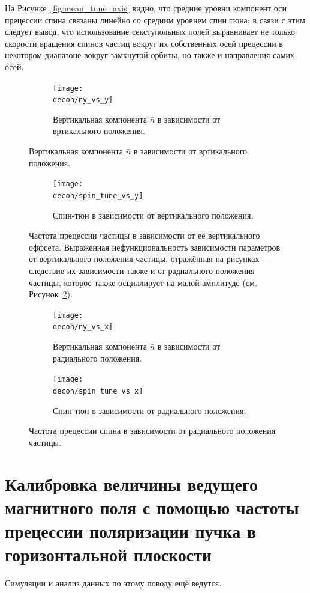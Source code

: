 \documentclass{report}
\newcommand{\home}{/home/alexa}
\newcommand{\Artem}{\home/REPOS/COSYINF/img/Artem}
\newcommand{\decoh}{\Artem/decoherence_frequency_dependence}
\begin{document}
На Рисунке~\ref{fig:mean_tune_axis} видно, что средние уровни компонент оси прецессии спина связаны линейно со средним уровнем спин тюна; в связи с этим следует вывод, что использование секступольных полей выравнивает не только скорости вращения спинов частиц вокруг их собственных осей прецессии в некотором диапазоне вокруг замкнутой орбиты, но также и направления самих осей. 
\begin{figure}[H]
  \centering
  \begin{subfigure}[b]{\textwidth}
    \texttt{[image: \\decoh/ny\_vs\_y]}
    \caption{Вертикальная компонента $\bar n$ в зависимости от
      вртикального положения.}
  \end{subfigure}
\end{figure}
\begin{figure}[H]\ContinuedFloat
  \begin{subfigure}[b]{\textwidth}
    \texttt{[image: \\decoh/spin\_tune\_vs\_y]}
    \caption{Спин-тюн в зависимости от вертикального положения.}
  \end{subfigure}
  \caption{Частота прецессии частицы в зависимости от её вертикального
    оффсета. Выраженная нефункциональность зависимости
    параметров от вертикального положения частицы, отражённая на
    рисунках --- следствие их зависимости также и от радиального положения
    частицы, которое также осциллирует на малой амплитуде (см. Рисунок~\ref{fig:tune_axis_position_x}). \label{fig:tune_axis_position_y}}
\end{figure}

\begin{figure}[H]
  \centering
  \begin{subfigure}[b]{\textwidth}
    \texttt{[image: \\decoh/ny\_vs\_x]}
    \caption{Вертикальная компонента $\bar n$ в зависимости от
      радиального положения.}
  \end{subfigure}

  \begin{subfigure}[b]{\textwidth}
    \texttt{[image: \\decoh/spin\_tune\_vs\_x]}
    \caption{Спин-тюн в зависимости от радиального положения.}
  \end{subfigure}
  \caption{Частота прецессии спина в зависимости от радиального
    положения частицы.\label{fig:tune_axis_position_x}}
\end{figure}


\section{Калибровка величины ведущего магнитного поля с помощью
  частоты прецессии поляризации пучка в горизонтальной плоскости}
Симуляции и анализ данных по этому поводу ещё ведутся.
\end{document}
